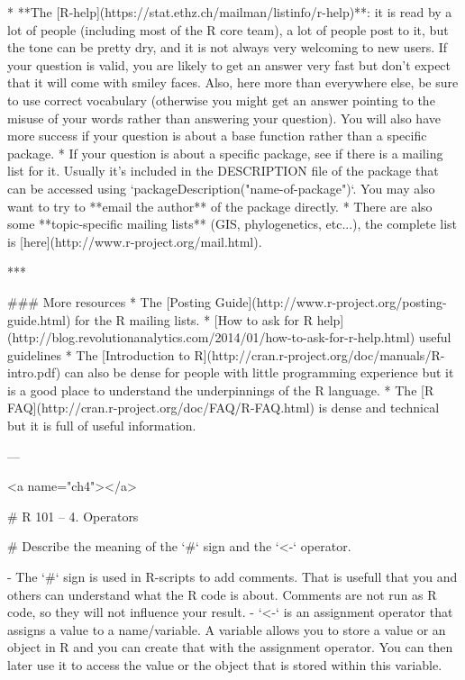 {{* **The [R-help](https://stat.ethz.ch/mailman/listinfo/r-help)**: it is read by a
  lot of people (including most of the R core team), a lot of people post to it,
  but the tone can be pretty dry, and it is not always very welcoming to new
  users. If your question is valid, you are likely to get an answer very fast
  but don't expect that it will come with smiley faces. Also, here more than
  everywhere else, be sure to use correct vocabulary (otherwise you might get an
  answer pointing to the misuse of your words rather than answering your
  question). You will also have more success if your question is about a base
  function rather than a specific package.
* If your question is about a specific package, see if there is a mailing list
  for it. Usually it's included in the DESCRIPTION file of the package that can
  be accessed using `packageDescription("name-of-package")`. You may also want
  to try to **email the author** of the package directly.
* There are also some **topic-specific mailing lists** (GIS, phylogenetics, etc...),
  the complete list is [here](http://www.r-project.org/mail.html).
  
***
  
### More resources
* The [Posting Guide](http://www.r-project.org/posting-guide.html) for the R
  mailing lists.
* [How to ask for R help](http://blog.revolutionanalytics.com/2014/01/how-to-ask-for-r-help.html)
  useful guidelines
* The [Introduction to R](http://cran.r-project.org/doc/manuals/R-intro.pdf) can also be dense for people with little programming experience but it is a good place to understand the underpinnings of the R language.
* The [R FAQ](http://cran.r-project.org/doc/FAQ/R-FAQ.html) is dense and technical but it is full of useful information.


---

<a name="ch4"></a>

# R 101 -- 4. Operators



# Describe the meaning of the `#` sign and the `<-` operator.

- The `#` sign is used in R-scripts to add comments. That is usefull that you and others can understand what the R code is about. Comments are not run as R code, so they will not influence your result. 
- `<-` is an assignment operator that assigns a value to a name/variable.  A variable allows you to store a value or an object in R and you can create that with the assignment operator. You can then later use it to access the value or the object that is stored within this variable.

}}
